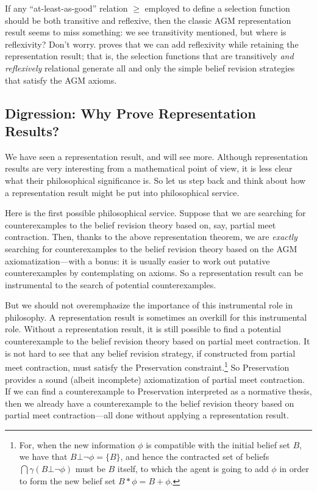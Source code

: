 If any ``at-least-as-good'' relation $\ge$ employed to define a selection function should be both transitive and reflexive, then the classic AGM representation result seems to miss something: we see transitivity mentioned, but where is reflexivity? Don't worry. \citet{rott1993belief} proves that we can add reflexivity while retaining the representation result; that is, the selection functions that are transitively {\em and reflexively} relational generate all and only the simple belief revision strategies that satisfy the AGM axioms.



\subsection{Digression: Why Prove Representation Results?}

We have seen a representation result, and will see more. Although representation results are very interesting from a mathematical point of view, it is less clear what their philosophical significance is. So let us step back and think about how a representation result might be put into philosophical service. 

Here is the first possible philosophical service. Suppose that we are searching for counterexamples to the belief revision theory based on, say, partial meet contraction. Then, thanks to the above representation theorem, we are {\em exactly} searching for counterexamples to the belief revision theory based on the AGM axiomatization---with a bonus: it is usually easier to work out putative counterexamples by contemplating on axioms. So a representation result can be instrumental to the search of potential counterexamples. 

But we should not overemphasize the importance of this instrumental role in philosophy. A representation result is sometimes an overkill for this instrumental role. Without a representation result, it is still possible to find a potential counterexample to the belief revision theory based on partial meet contraction. It is not hard to see that any belief revision strategy, if constructed from partial meet contraction, must satisfy the Preservation constraint.\footnote
	{For, when the new information $\phi$ is compatible with the initial belief set $B$, we have that $B \bot \neg\phi = \{B\}$, and hence the contracted set of beliefs $\bigcap \gamma(B \bot \neg\phi)$ must be $B$ itself, to which the agent is going to add $\phi$ in order to form the new belief set $B * \phi = B + \phi$.}
So Preservation provides a sound (albeit incomplete) axiomatization of partial meet contraction. If we can find a counterexample to Preservation interpreted as a normative thesis, then we already have a counterexample to the belief revision theory based on partial meet contraction---all done without applying a representation result. 

